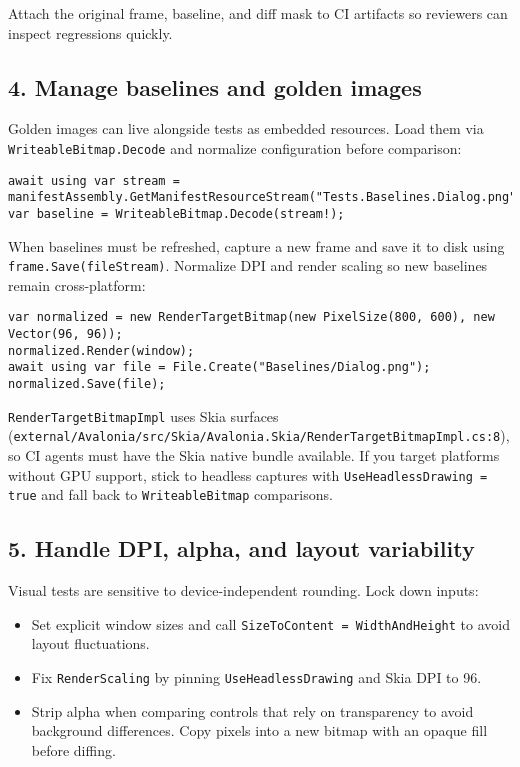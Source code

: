 Attach the original frame, baseline, and diff mask to CI artifacts so
reviewers can inspect regressions quickly.

\subsection{4. Manage baselines and golden
images}\label{manage-baselines-and-golden-images}

Golden images can live alongside tests as embedded resources. Load them
via \passthrough{\lstinline!WriteableBitmap.Decode!} and normalize
configuration before comparison:

\begin{lstlisting}
await using var stream = manifestAssembly.GetManifestResourceStream("Tests.Baselines.Dialog.png");
var baseline = WriteableBitmap.Decode(stream!);
\end{lstlisting}

When baselines must be refreshed, capture a new frame and save it to
disk using \passthrough{\lstinline!frame.Save(fileStream)!}. Normalize
DPI and render scaling so new baselines remain cross-platform:

\begin{lstlisting}
var normalized = new RenderTargetBitmap(new PixelSize(800, 600), new Vector(96, 96));
normalized.Render(window);
await using var file = File.Create("Baselines/Dialog.png");
normalized.Save(file);
\end{lstlisting}

\passthrough{\lstinline!RenderTargetBitmapImpl!} uses Skia surfaces
(\passthrough{\lstinline!external/Avalonia/src/Skia/Avalonia.Skia/RenderTargetBitmapImpl.cs:8!}),
so CI agents must have the Skia native bundle available. If you target
platforms without GPU support, stick to headless captures with
\passthrough{\lstinline!UseHeadlessDrawing = true!} and fall back to
\passthrough{\lstinline!WriteableBitmap!} comparisons.

\subsection{5. Handle DPI, alpha, and layout
variability}\label{handle-dpi-alpha-and-layout-variability}

Visual tests are sensitive to device-independent rounding. Lock down
inputs:

\begin{itemize}
\tightlist
\item
  Set explicit window sizes and call
  \passthrough{\lstinline!SizeToContent = WidthAndHeight!} to avoid
  layout fluctuations.
\item
  Fix \passthrough{\lstinline!RenderScaling!} by pinning
  \passthrough{\lstinline!UseHeadlessDrawing!} and Skia DPI to 96.
\item
  Strip alpha when comparing controls that rely on transparency to avoid
  background differences. Copy pixels into a new bitmap with an opaque
  fill before diffing.
\end{itemize}

